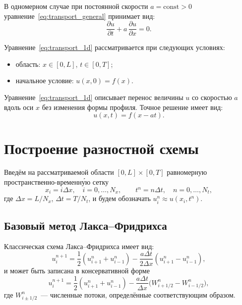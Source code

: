 \documentclass[14pt]{report}
\begin{document}
В одномерном случае при постоянной скорости $a = \mathrm{const} > 0$ уравнение~\eqref{eq:transport_general} принимает вид:
\begin{equation}
\frac{\partial u}{\partial t} + a\,\frac{\partial u}{\partial x} = 0.
\label{eq:transport_1d}
\end{equation}

Уравнение~\eqref{eq:transport_1d} рассматривается при следующих условиях:
\begin{itemize}
\item область: $x \in [0, L]$, $t \in [0, T]$;
\item начальное условие: $u(x, 0) = f(x)$.
\end{itemize}

Уравнение~\eqref{eq:transport_1d} описывает перенос величины $u$ со скоростью $a$ вдоль оси $x$ без изменения формы профиля. Точное решение имеет вид:
\begin{equation*}
u(x,t) = f(x - at).
\end{equation*}

\chapter{Построение разностной схемы}
\label{sec:scheme}

Введём на рассматриваемой области $[0,L]\times[0,T]$ равномерную пространственно-временн\'{у}ю сетку
\begin{equation*}
x_i = i\Delta x,\quad i=0,\dots,N_x,\qquad 
t^n = n\Delta t,\quad n=0,\dots,N_t,
\end{equation*}
где $\Delta x = L/N_x$, $\Delta t = T/N_t$, и будем обозначать $u_i^n \approx u(x_i,t^n)$.

\section{Базовый метод Лакса--Фридрихса}
Классическая схема Лакса--Фридрихса имеет вид:
\begin{equation}
u_i^{n+1} = \frac{1}{2}(u_{i+1}^n + u_{i-1}^n) 
            - \frac{a\Delta t}{2\Delta x}(u_{i+1}^n - u_{i-1}^n),
\label{eq:lax-friedrichs}
\end{equation}
и может быть записана в консервативной форме
\begin{equation*}
u_i^{n+1} = \frac{1}{2}(u_{i+1}^n + u_{i-1}^n) 
            - \frac{a\Delta t}{\Delta x}\bigl(W^n_{i+1/2} - W^n_{i-1/2}\bigr),
\end{equation*}
где $W^n_{i\pm1/2}$~--- численные потоки, определённые соответствующим образом.
\end{document}
